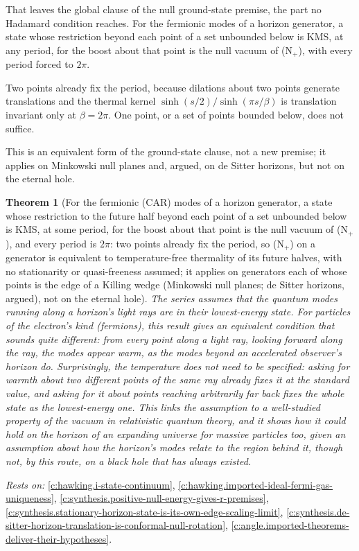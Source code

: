 \documentclass[11pt]{article}
\newtheorem{theorem}{Theorem}[section]
\theoremstyle{definition}
\theoremstyle{plain}
\begin{document}
That leaves the global clause of the null ground-state premise, the part no Hadamard condition reaches. For the fermionic modes of a horizon generator, a state whose restriction beyond each point of a set unbounded below is KMS, at any period, for the boost about that point is the null vacuum of (N$_{+}$), with every period forced to $2\pi$.

Two points already fix the period, because dilations about two points generate translations and the thermal kernel $\sinh(s/2)/\sinh(\pi s/\beta)$ is translation invariant only at $\beta = 2\pi$. One point, or a set of points bounded below, does not suffice.

This is an equivalent form of the ground-state clause, not a new premise; it applies on Minkowski null planes and, argued, on de Sitter horizons, but not on the eternal hole.

\begin{theorem}[For the fermionic (CAR) modes of a horizon generator, a state whose restriction to the future half beyond each point of a set unbounded below is KMS, at some period, for the boost about that point is the null vacuum of (N$_{+}$), and every period is $2\pi$: two points already fix the period, so (N$_{+}$) on a generator is equivalent to temperature-free thermality of its future halves, with no stationarity or quasi-freeness assumed; it applies on generators each of whose points is the edge of a Killing wedge (Minkowski null planes; de Sitter horizons, argued), not on the eternal hole]\label{c:synthesis.thermality-of-every-future-half-generator-fixes-the-period-and-the-null-ground-state}
The series assumes that the quantum modes running along a horizon's light rays are in their lowest-energy state. For particles of the electron's kind (fermions), this result gives an equivalent condition that sounds quite different: from every point along a light ray, looking forward along the ray, the modes appear warm, as the modes beyond an accelerated observer's horizon do. Surprisingly, the temperature does not need to be specified: asking for warmth about two different points of the same ray already fixes it at the standard value, and asking for it about points reaching arbitrarily far back fixes the whole state as the lowest-energy one. This links the assumption to a well-studied property of the vacuum in relativistic quantum theory, and it shows how it could hold on the horizon of an expanding universe for massive particles too, given an assumption about how the horizon's modes relate to the region behind it, though not, by this route, on a black hole that has always existed.
\end{theorem}
\noindent\emph{Rests on:} \ref{c:hawking.i-state-continuum}, \ref{c:hawking.imported-ideal-fermi-gas-uniqueness}, \ref{c:synthesis.positive-null-energy-gives-r-premises}, \ref{c:synthesis.stationary-horizon-state-is-its-own-edge-scaling-limit}, \ref{c:synthesis.de-sitter-horizon-translation-is-conformal-null-rotation}, \ref{c:angle.imported-theorems-deliver-their-hypotheses}.
\end{document}
